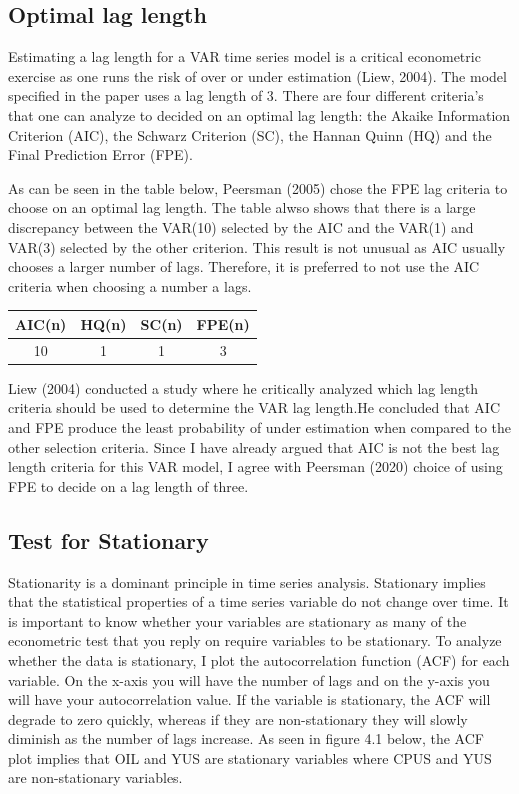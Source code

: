 \documentclass[11pt,preprint, authoryear]{elsarticle}
\numberwithin{equation}{section}
\numberwithin{figure}{section}
\numberwithin{table}{section}
\begin{document}
\hypertarget{optimal-lag-length}{%
\subsection{Optimal lag length}\label{optimal-lag-length}}

Estimating a lag length for a VAR time series model is a critical
econometric exercise as one runs the risk of over or under estimation
(Liew, 2004). The model specified in the paper uses a lag length of 3.
There are four different criteria's that one can analyze to decided on
an optimal lag length: the Akaike Information Criterion (AIC), the
Schwarz Criterion (SC), the Hannan Quinn (HQ) and the Final Prediction
Error (FPE).

As can be seen in the table below, Peersman (2005) chose the FPE lag
criteria to choose on an optimal lag length. The table alwso shows that
there is a large discrepancy between the VAR(10) selected by the AIC and
the VAR(1) and VAR(3) selected by the other criterion. This result is
not unusual as AIC usually chooses a larger number of lags. Therefore,
it is preferred to not use the AIC criteria when choosing a number a
lags.

\begin{center}
\begin{tabular}{ |c|c|c|c| } 
 \hline
 AIC(n) & HQ(n) & SC(n) & FPE(n) \\ 
 \hline
 10 & 1 & 1 & 3\\ 
 \hline
\end{tabular}
\end{center}

Liew (2004) conducted a study where he critically analyzed which lag
length criteria should be used to determine the VAR lag length.He
concluded that AIC and FPE produce the least probability of under
estimation when compared to the other selection criteria. Since I have
already argued that AIC is not the best lag length criteria for this VAR
model, I agree with Peersman (2020) choice of using FPE to decide on a
lag length of three.

\hypertarget{test-for-stationary}{%
\subsection{\texorpdfstring{Test for Stationary
\label{stationary}}{Test for Stationary }}\label{test-for-stationary}}

Stationarity is a dominant principle in time series analysis. Stationary
implies that the statistical properties of a time series variable do not
change over time. It is important to know whether your variables are
stationary as many of the econometric test that you reply on require
variables to be stationary. To analyze whether the data is stationary, I
plot the autocorrelation function (ACF) for each variable. On the x-axis
you will have the number of lags and on the y-axis you will have your
autocorrelation value. If the variable is stationary, the ACF will
degrade to zero quickly, whereas if they are non-stationary they will
slowly diminish as the number of lags increase. As seen in figure 4.1
below, the ACF plot implies that OIL and YUS are stationary variables
where CPUS and YUS are non-stationary variables.
\end{document}
